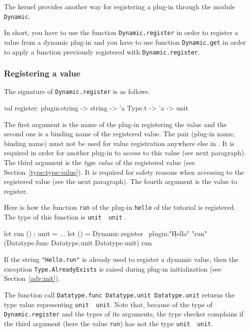 The \framac kernel provides another way for registering a plug-in through the
module \texttt{Dynamic}.

In short, you have to use the function
\texttt{Dynamic.register} in order to register a
value from a dynamic plug-in and you have to use function
\texttt{Dynamic.get} in order to apply a function
previously registered with \texttt{Dynamic.register}.

\subsubsection{Registering a value}

The signature of \texttt{Dynamic.register} is as
follows.
\begin{ocamlcode}
val register: plugin:string -> string -> 'a Type.t -> 'a ->
unit
\end{ocamlcode}
The first argument is the name of the plug-in registering the value and the
second one is a binding name of the registered \caml value. The pair (plug-in
name, binding name) must not be used for value registration anywhere else in
\framac. It is required in order for another plug-in to access to this value
(see next paragraph). The third argument is the \emph{type value}%
 of the registered value (see
Section~\ref{type:type-value}). It is required for safety reasons when accessing
to the registered value (see the next paragraph). The fourth argument is the
value to register.

\begin{example}
  Here is how the function \texttt{run} of the plug-in
  \texttt{hello} of the tutorial is registered. The type of this function is
  \texttt{unit \fl~unit}%
  .
\begin{ocamlcode}
let run () : unit = ...
let () =
  Dynamic.register
    ~plugin:"Hello"
    "run"
    (Datatype.func Datatype.unit Datatype.unit)
    run
\end{ocamlcode}
If the string \texttt{"Hello.run"} is already used to register a
dynamic value, then the exception
\texttt{Type.AlreadyExists} is raised during
plug-in initialization (see Section~\ref{adv:init}).

The function call \texttt{Datatype.func Datatype.unit Datatype.unit} returns the
type value representing \texttt{unit \fl~unit}. Note that,
because of the type of \texttt{Dynamic.register} and the types of its arguments,
the \caml type checker complains if the third argument (here the value
\texttt{run}) has not the type \texttt{unit \fl~unit}.
\end{example}

